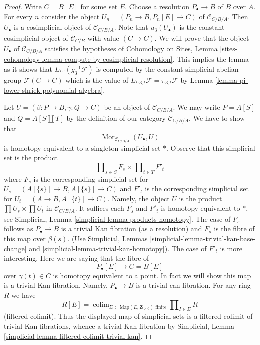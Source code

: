 \documentclass{stacks-project}
\theoremstyle{plain}
\theoremstyle{definition}
\theoremstyle{remark}
\numberwithin{equation}{subsection}
\def\colim{\mathop{\mathrm{colim}}\nolimits}
\def\Mor{\mathop{\mathrm{Mor}}\nolimits}
\begin{document}
\begin{proof}
Write $C = B[E]$ for some set $E$. Choose a resolution
$P_\bullet \to B$ of $B$ over $A$. For every $n$ consider
the object $U_n = (P_n \to B, P_n[E] \to C)$ of $\mathcal{C}_{C/B/A}$.
Then $U_\bullet$ is a cosimplicial object of $\mathcal{C}_{C/B/A}$.
Note that $u_3(U_\bullet)$ is the constant cosimplicial
object of $\mathcal{C}_{C/B}$ with value $(C \to C)$.
We will prove that the object $U_\bullet$ of $\mathcal{C}_{C/B/A}$
satisfies the hypotheses of
Cohomology on Sites, Lemma
\ref{sites-cohomology-lemma-compute-by-cosimplicial-resolution}.
This implies the lemma as it shows that $L\pi_!(g_3^{-1}\mathcal{F})$
is computed by the constant simplicial abelian group
$\mathcal{F}(C \to C)$ which is the value of
$L\pi_{3, !}\mathcal{F} = \pi_{3, !}\mathcal{F}$ by
Lemma \ref{lemma-pi-lower-shriek-polynomial-algebra}.

\medskip\noindent
Let $U = (\beta : P \to B, \gamma : Q \to C)$ be an object of
$\mathcal{C}_{C/B/A}$. We may write $P = A[S]$ and $Q = A[S \amalg T]$
by the definition of our category $\mathcal{C}_{C/B/A}$. We have to show that
$$
\Mor_{\mathcal{C}_{C/B/A}}(U_\bullet, U)
$$
is homotopy equivalent to a singleton simplicial set $*$. Observe that this
simplicial set is the product
$$
\prod\nolimits_{s \in S} F_s \times \prod\nolimits_{t \in T} F'_t
$$
where $F_s$ is the corresponding simplicial set for
$U_s = (A[\{s\}] \to B, A[\{s\}] \to C)$
and $F'_t$ is the corresponding simplicial set for
$U_t = (A \to B, A[\{t\}] \to C)$. Namely, the object $U$
is the product $\prod U_s \times \prod U_t$ in $\mathcal{C}_{C/B/A}$.
It suffices each $F_s$ and $F'_t$ is homotopy equivalent to $*$, see
Simplicial, Lemma \ref{simplicial-lemma-products-homotopy}.
The case of $F_s$ follows as $P_\bullet \to B$ is a trivial Kan
fibration (as a resolution) and $F_s$ is the fibre of this map over
$\beta(s)$. (Use Simplicial, Lemmas
\ref{simplicial-lemma-trivial-kan-base-change} and
\ref{simplicial-lemma-trivial-kan-homotopy}).
The case of $F'_t$ is more interesting. Here we are saying that
the fibre of
$$
P_\bullet[E] \longrightarrow C = B[E]
$$
over $\gamma(t) \in C$ is homotopy equivalent to a point. In fact we
will show this map is a trivial Kan fibration. Namely,
$P_\bullet \to B$ is a trivial can fibration. For any ring $R$
we have
$$
R[E] =
\colim_{\Sigma \subset \text{Map}(E, \mathbf{Z}_{\geq 0})\text{ finite}}
\prod\nolimits_{I \in \Sigma} R
$$
(filtered colimit). Thus the displayed map of simplicial sets is a
filtered colimit of trivial Kan fibrations, whence a trivial Kan fibration
by Simplicial, Lemma \ref{simplicial-lemma-filtered-colimit-trivial-kan}.
\end{proof}
\end{document}

